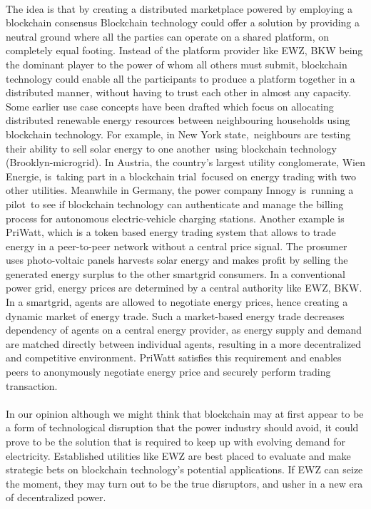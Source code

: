 \documentclass{scrartcl}
\begin{document}
    \paragraph{}
    The idea is that by creating a distributed marketplace powered by employing a blockchain consensus Blockchain technology could offer a solution by providing a neutral ground where all the parties can operate on a shared platform, on completely equal footing. Instead of the platform provider like EWZ, BKW being the dominant player to the power of whom all others must submit, blockchain technology could enable all the participants to produce a platform together in a distributed manner, without having to trust each other in almost any capacity. Some earlier use case concepts have been drafted which focus on allocating distributed renewable energy resources between neighbouring households using blockchain technology. For example, in New York state, neighbours are testing their ability to sell solar energy to one another using blockchain technology (Brooklyn-microgrid). In Austria, the country’s largest utility conglomerate, Wien Energie, is taking part in a blockchain trial focused on energy trading with two other utilities. Meanwhile in Germany, the power company Innogy is running a pilot to see if blockchain technology can authenticate and manage the billing process for autonomous electric-vehicle charging stations. Another example is PriWatt, which is a token based energy trading system that allows to trade energy in a peer-to-peer network without a central price signal. The prosumer uses photo-voltaic panels harvests solar energy and makes profit by selling the generated energy surplus to the other smartgrid consumers. In a conventional power grid, energy prices are determined by a central authority like EWZ, BKW. In a smartgrid, agents are allowed to negotiate energy prices, hence creating a dynamic market of energy trade. Such a market-based energy trade decreases dependency of agents on a central energy provider, as energy supply and demand are matched directly between individual agents, resulting in a more decentralized and competitive environment. PriWatt satisfies this requirement and enables peers to anonymously negotiate energy price and securely perform trading transaction.
    
    \paragraph{}
    In our opinion although we might think that blockchain may at first appear to be a form of technological disruption that the power industry should avoid, it could prove to be the solution that is required to keep up with evolving demand for electricity. Established utilities like EWZ are best placed to evaluate and make strategic bets on blockchain technology’s potential applications. If EWZ can seize the moment, they may turn out to be the true disruptors, and usher in a new era of decentralized power.
	
\end{document}
